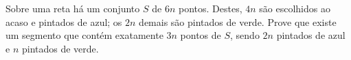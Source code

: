 Sobre uma reta há um conjunto $S$ de $6n$ pontos.
Destes, $4n$ são escolhidos ao acaso e pintados de azul; os $2n$ demais são pintados de verde.
Prove que existe um segmento que contém exatamente $3n$ pontos de $S$, sendo
$2n$ pintados de azul e $n$ pintados de verde.